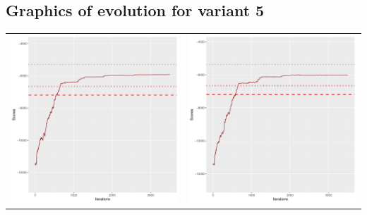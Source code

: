 \documentclass[]{scrartcl}
\begin{document}
\clearpage

\subsection{Graphics of evolution for variant 5}

\begin{table}[h!]
\begin{tabular}{cc}
\includegraphics[scale = 0.4]{./figs/alarm/v5/30/boundsEvolution-3502.pdf} & 
\includegraphics[scale = 0.4]{./figs/alarm/v5/50/boundsEvolution-3502.pdf} \\

\end{tabular}
\end{table}
\end{document}
